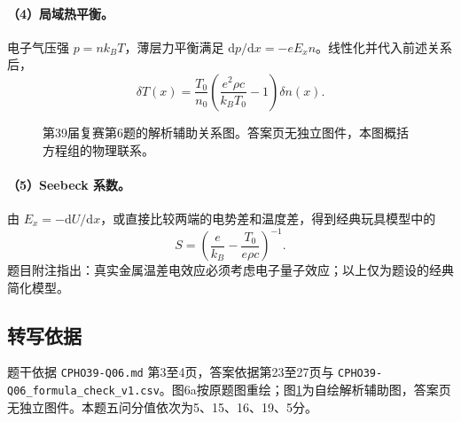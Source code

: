\paragraph{（4）局域热平衡。}
电子气压强 $p=nk_BT$，薄层力平衡满足 $\mathrm dp/\mathrm dx=-eE_xn$。线性化并代入前述关系后，
\[
\boxed{\delta T(x)=\frac{T_0}{n_0}\left(\frac{e^2\rho c}{k_BT_0}-1\right)\delta n(x).}
\]
\begin{figure}[htbp]\centering
  
  \caption{第39届复赛第6题的解析辅助关系图。答案页无独立图件，本图概括方程组的物理联系。}\label{fig:cpho39q06chain}
\end{figure}

\paragraph{（5）Seebeck 系数。}
由 $E_x=-\mathrm dU/\mathrm dx$，或直接比较两端的电势差和温度差，得到经典玩具模型中的
\[
\boxed{S=\left(\frac{e}{k_B}-\frac{T_0}{e\rho c}\right)^{-1}.}
\]
题目附注指出：真实金属温差电效应必须考虑电子量子效应；以上仅为题设的经典简化模型。

\subsection{转写依据}
题干依据 \texttt{CPHO39-Q06.md} 第3至4页，答案依据第23至27页与 \texttt{CPHO39-Q06\_formula\_check\_v1.csv}。图6a按原题图重绘；图\ref{fig:cpho39q06chain}为自绘解析辅助图，答案页无独立图件。本题五问分值依次为5、15、16、19、5分。
